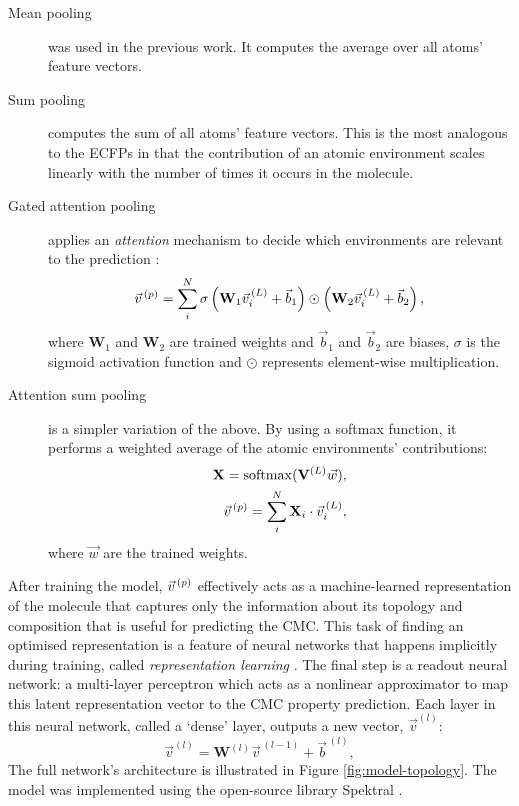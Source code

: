\begin{description}
    \item[Mean pooling] was used in the previous work. It computes the average
          over all atoms' feature vectors.
    \item[Sum pooling] computes the sum of all atoms' feature vectors. This is
          the most analogous to the ECFPs in that the contribution of an atomic environment
          scales linearly with the number of times it occurs in the molecule.
    \item[Gated attention pooling] applies an \emph{attention} mechanism to decide which environments
          are relevant to the prediction \cite{liGatedGraphSequence2017}:
          \begin{equation}
              \vec{v}^{\,(p)}{} = \sum_i^N \sigma\left(\mathbf{W}_1 \vec{v}_i^{\,(L)} + \vec{b}_1 \right) \odot \left(\mathbf{W}_2 \vec{v}_i^{\,(L)} + \vec{b}_2 \right),
          \end{equation}
          where $\mathbf{W}_1$ and $\mathbf{W}_2$ are trained weights and $\vec{b}_1$
          and $\vec{b}_2$ are biases, $\sigma$ is the sigmoid activation function and
          $\odot$ represents element-wise multiplication.
    \item[Attention sum pooling] is a simpler variation of the above. By using a
          softmax function, it performs a weighted average of the atomic environments'
          contributions:
          \begin{align}
              \mathbf{X} = \mathrm{softmax}(\mathbf{V}^{(L)}\vec{w}), \\
              \vec{v}^{\,(p)}{} = \sum_i^N \mathbf{X}_i \cdot \vec{v}^{\,(L)}_i,
          \end{align}
          where $\vec{w}$ are the trained weights.
\end{description}

After training the model, $\vec{v}^{\,(p)}{}$ effectively acts as a machine-learned
representation of the molecule that captures only the information about its
topology and composition that is useful for predicting the CMC. This task of
finding an optimised representation is a feature of neural networks that happens
implicitly during training, called \emph{representation learning}
\cite{goodfellowDeepLearning2016a}. The final step is a readout neural network:
a multi-layer perceptron which acts as a nonlinear approximator to map this
latent representation vector to the CMC property prediction. Each layer in this
neural network, called a `dense' layer, outputs a new vector, $\vec{v}^{(l)}$:
\begin{equation}
    \vec{v}^{(l)} = \mathbf{W}^{(l)}\vec{v}^{\,(l-1)} + \vec{b}^{\,(l)},
\end{equation}
The full network's architecture is illustrated in Figure
\ref{fig:model-topology}. The model was implemented using the open-source
library Spektral \cite{grattarolaGraphNeuralNetworks2020}.

